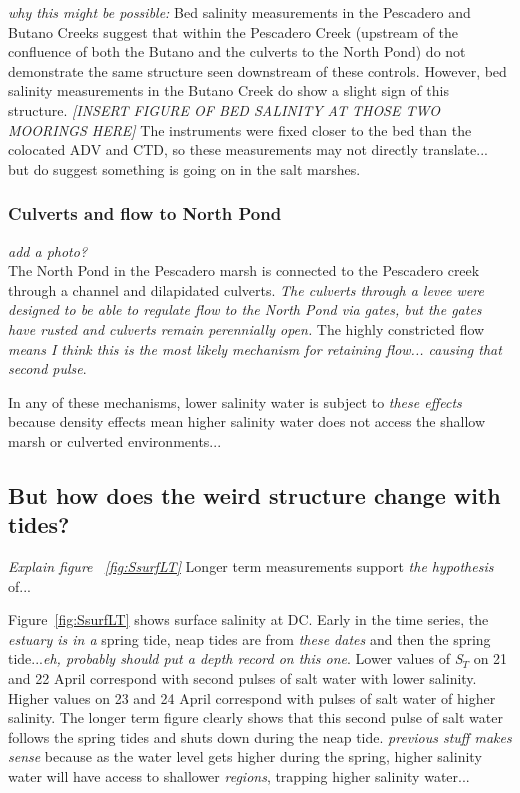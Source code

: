 \emph{why this might be possible:}  Bed salinity measurements in the Pescadero and Butano Creeks suggest that within the Pescadero Creek (upstream of the confluence of both the Butano and the culverts to the North Pond) do not demonstrate the same structure seen downstream of these controls. However, bed salinity measurements in the Butano Creek do show a slight sign of this structure. \emph{[INSERT FIGURE OF BED SALINITY AT THOSE TWO MOORINGS HERE]} The instruments were fixed closer to the bed than the colocated ADV and CTD, so these measurements may not directly translate... but do suggest something is going on in the salt marshes.  

\subsubsection{Culverts and flow to North Pond}
\emph{add a photo?}\\
The North Pond in the Pescadero marsh is connected to the Pescadero creek through a channel and dilapidated culverts. \emph{The culverts through a levee were designed to be able to regulate flow to the North Pond via gates, but the gates have rusted and culverts remain perennially open.} The highly constricted flow \emph{means I think this is the most likely mechanism for retaining flow... causing that second pulse}.  

In any of these mechanisms, lower salinity water is subject to \emph{these effects} because density effects mean higher salinity water does not access the shallow marsh or culverted environments... 

\subsection{But how does the weird structure change with tides?}
\emph{Explain figure ~\ref{fig:SsurfLT}}
Longer term measurements support \emph{the hypothesis} of...

Figure~\ref{fig:SsurfLT} shows surface salinity at DC. Early in the time series, the \emph{estuary is in a} spring tide, neap tides are from \emph{these dates} and then the spring tide...\emph{eh, probably should put a depth record on this one}. Lower values of \emph{S$_T$} on 21 and 22 April correspond with second pulses of salt water with lower salinity. Higher values on 23 and 24 April correspond with pulses of salt water of higher salinity. The longer term figure clearly shows that this second pulse of salt water follows the spring tides and shuts down during the neap tide. \emph{previous stuff makes sense} because as the water level gets higher during the spring, higher salinity water will have access to shallower \emph{regions}, trapping higher salinity water... 

